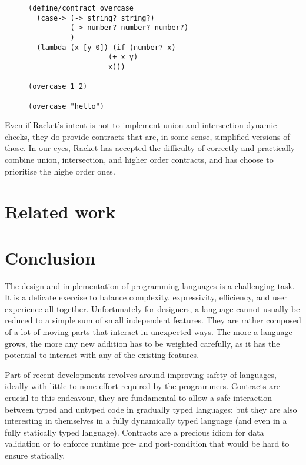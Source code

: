 \documentclass[sigplan,10pt,review,anonymous]{acmart}
\newcommand{\info}[2][1=]{}
\begin{document}
\begin{figure}[h]

\begin{lstlisting}[language=racket]
(define/contract overcase
  (case-> (-> string? string?)
          (-> number? number? number?)
          )
  (lambda (x [y 0]) (if (number? x)
                   (+ x y)
                   x)))

(overcase 1 2)

(overcase "hello")
\end{lstlisting}
\end{figure}

Even if Racket's intent is not to implement union and intersection
dynamic checks, they do provide contracts that are, in some sense,
simplified versions of those.
In our eyes, Racket has accepted the difficulty of correctly and practically
combine union, intersection, and higher order contracts, and has choose
to prioritise the highe order ones.



\section{Related work}
\label{sec:related-work}
\info{Including a mention of statically typed systems with union}



\section{Conclusion}
\label{sec:conclusion}

The design and implementation of programming languages is a challenging task. It
is a delicate exercise to balance complexity, expressivity, efficiency, and
user experience all together. Unfortunately for designers, a language cannot
usually be reduced to a simple sum of small independent features. They are
rather composed of a lot of moving parts that interact in unexpected ways. The
more a language grows, the more any new addition has to be weighted carefully,
as it has the potential to interact with any of the existing features.

Part of recent developments revolves around improving safety of
languages, ideally with little to none effort required by the programmers.
Contracts are crucial to this endeavour, they are fundamental to
allow a safe interaction between typed and untyped code in gradually typed languages;
but they are also interesting in themselves in a fully dynamically typed
language (and even in a fully statically typed language). Contracts are a
precious idiom for data validation or to enforce runtime pre- and post-condition that
would be hard to ensure statically.
\end{document}
